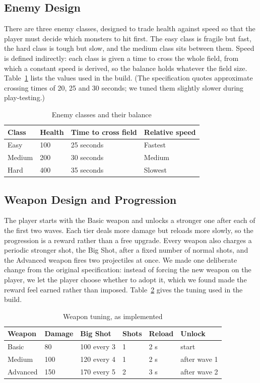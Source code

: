 \documentclass[12pt,a4paper]{report}
\begin{document}
\subsection{Enemy Design}

There are three enemy classes, designed to trade health against speed so that
the player must decide which monsters to hit first. The easy class is fragile
but fast, the hard class is tough but slow, and the medium class sits between
them. Speed is defined indirectly: each class is given a time to cross the whole
field, from which a constant speed is derived, so the balance holds whatever the
field size. Table~\ref{tab:enemies} lists the values used in the build. (The
specification quotes approximate crossing times of 20, 25 and 30 seconds; we
tuned them slightly slower during play-testing.)

\begin{table}[htbp]
\centering
\caption{Enemy classes and their balance}
\label{tab:enemies}
\begin{tabular}{|p{2.6cm}|p{2.4cm}|p{3.2cm}|p{3.0cm}|}
\hline
Class & Health & Time to cross field & Relative speed \\
\hline
Easy   & 100 & 25 seconds & Fastest \\
\hline
Medium & 200 & 30 seconds & Medium \\
\hline
Hard   & 400 & 35 seconds & Slowest \\
\hline
\end{tabular}
\end{table}

\subsection{Weapon Design and Progression}

The player starts with the Basic weapon and unlocks a stronger one after each of
the first two waves. Each tier deals more damage but reloads more slowly, so the
progression is a reward rather than a free upgrade. Every weapon also charges a
periodic stronger shot, the Big Shot, after a fixed number of normal shots, and
the Advanced weapon fires two projectiles at once. We made one deliberate change
from the original specification: instead of forcing the new weapon on the
player, we let the player choose whether to adopt it, which we found made the
reward feel earned rather than imposed. Table~\ref{tab:weapons} gives the tuning
used in the build.

\begin{table}[htbp]
\centering
\caption{Weapon tuning, as implemented}
\label{tab:weapons}
\begin{tabular}{|p{2.2cm}|p{1.6cm}|p{2.4cm}|p{1.8cm}|p{1.6cm}|p{2.0cm}|}
\hline
Weapon & Damage & Big Shot & Shots & Reload & Unlock \\
\hline
Basic    & 80  & 100 every 3 & 1 & 2 s & start \\
\hline
Medium   & 100 & 120 every 4 & 1 & 2 s & after wave 1 \\
\hline
Advanced & 150 & 170 every 5 & 2 & 3 s & after wave 2 \\
\hline
\end{tabular}
\end{table}
\end{document}
